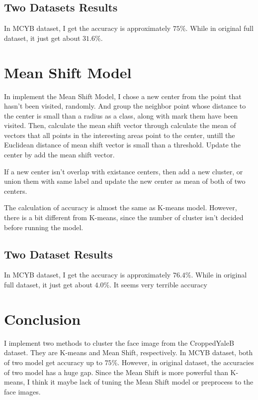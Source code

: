 \documentclass[10pt,twocolumn,letterpaper]{article}
\begin{document}
\subsection{Two Datasets Results}
In MCYB dataset, I get the accuracy is approximately $75\%$. While in original full dataset, it just get about $31.6\%$.

\section{Mean Shift Model}
In implement the Mean Shift Model, I chose a new center from the point that hasn't been visited, randomly. And group the neighbor point whose distance to the center is small than a radius as a class, along with mark them have been visited. Then, calculate the mean shift vector through calculate the mean of vectors that all points in the interesting areas point to the center, untill the Euclidean distance of mean shift vector is small than a threshold. Update the center by add the mean shift vector.
\par If a new center isn't overlap with existance centers, then add a new cluster, or union them with same label and update the new center as mean of both of two centers.
\par The calculation of accuracy is almost the same as K-means model. However, there is a bit different from K-means, since the number of cluster isn't decided before running the model.
\subsection{Two Dataset Results}
In MCYB dataset, I get the accuracy is approximately $76.4\%$. While in original full dataset, it just get about $4.0\%$. It seems very terrible accuracy

\section{Conclusion}
I implement two methods to cluster the face image from the CroppedYaleB dataset. They are K-means and Mean Shift, respectively. In MCYB dataset, both of two model get accuracy up to $75\%$. However, in original dataset, the accuracies of two model has a huge gap. Since the Mean Shift is more powerful than K-means, I think it maybe lack of tuning the Mean Shift model or preprocess to the face images.


{\small


}
\end{document}
